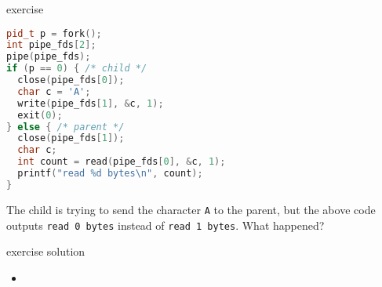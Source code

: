 \begin{frame}[fragile,label=pipeExtraEx1]{exercise}
\begin{lstlisting}[language=C++,basicstyle=\tt\fontsize{9.5}{10.5}\selectfont]
pid_t p = fork();
int pipe_fds[2];
pipe(pipe_fds);
if (p == 0) { /* child */
  close(pipe_fds[0]);
  char c = 'A';
  write(pipe_fds[1], &c, 1);
  exit(0);
} else { /* parent */
  close(pipe_fds[1]);
  char c;
  int count = read(pipe_fds[0], &c, 1);
  printf("read %d bytes\n", count);
}
\end{lstlisting}
The child is trying to send the character \texttt{A} to the parent, but
the above code outputs \texttt{read 0 bytes} instead of \texttt{read 1 bytes}.
What happened?
\end{frame}

\begin{frame}{exercise solution}
    \begin{itemize}
        \item \iftoggle{heldback}{~}{pipe() is after fork --- two pipes, one in child, one in parent}
    \end{itemize}
\end{frame}

